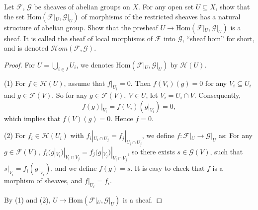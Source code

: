 \begin{exe}
	\label{2.1.15}
	Let $\mathscr{F}$, $\mathscr{G}$ be sheaves of abelian groups on $X$. For any open set $U\subseteq X$,
	show that the set $\mathrm{Hom}(\mathscr{F}|_U,\mathscr{G}|_U)$ of morphisms of the restricted sheaves has a natural structure of abelian group.
	Show that the presheaf $U \rightarrow \mathrm{Hom}(\mathscr{F}|_U,\mathscr{G}|_U)$ is a sheaf. It is called the sheaf of local morphisms of
	$\mathscr{F}$ into $\mathscr{G}$, ``sheaf hom'' for short, and is denoted $\mathscr{H}om(\mathscr{F},\mathscr{G}) $.
	
\end{exe}

\begin{proof}
	For $U=\bigcup_{i\in I}U_i$, we denotes $\mathrm{Hom}(\mathscr{F}|_U,\mathscr{G}|_U)$ by $\mathscr{H}(U)$.
	
	
	(1) For $f\in \mathscr{H}(U)$, assume that $f|_{U_i}=0$. Then $f(V_i)(g)=0$ for any $V_i\subseteq U_i$ and $g\in \mathscr{F}(V)$.
	So for any $g\in \mathscr{F}(V),\ V\in U$, let $V_i=U_i\cap V$. Consequently, $$f(g)|_{V_i}=f(V_i)(g|_{V_i})=0,$$ which
	implies that $f(V)(g)=0$. Hence $f=0$.
	
	
	(2) For $f_i\in\mathscr{H}(U_i)$ with $f_i|_{U_i\cap U_j}=f_j|_{U_i\cap U_j}$, we define $f:\mathscr{F}|_U\rightarrow\mathscr{G}|_U$ as:
	For any $g\in \mathscr{F}(V)$, $f_i(g|_{V_i})|_{V_i\cap V_j}=f_j(g|_{V_j})|_{V_i\cap V_j}$, so there exists $s\in \mathscr{G}(V)$, such that
	$s|_{V_i}=f_i(g|_{V_i})$, and we define $f(g)=s$. It is easy to check that $f$ is a morphism of sheaves, and $f|_{U_i}=f_i$.
	
	
	By (1) and (2), $U \rightarrow \mathrm{Hom}(\mathscr{F}|_U,\mathscr{G}|_U)$ is a sheaf.
\end{proof}
